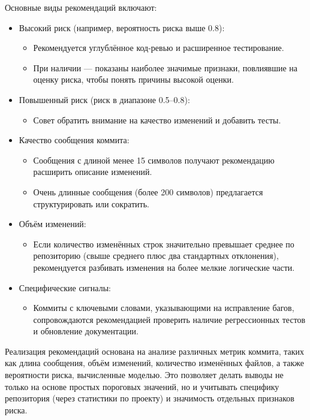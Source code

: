 \begin{itemize}
Основные виды рекомендаций включают:

\begin{itemize}
	\item Высокий риск (например, вероятность риска выше 0.8): 
	\begin{itemize}
		\item Рекомендуется углублённое код-ревью и расширенное тестирование.
		\item При наличии — показаны наиболее значимые признаки, повлиявшие на оценку риска, чтобы понять причины высокой оценки.
	\end{itemize}
	\item Повышенный риск (риск в диапазоне 0.5–0.8): 
	\begin{itemize}
		\item Совет обратить внимание на качество изменений и добавить тесты.
	\end{itemize}
	\item Качество сообщения коммита:
	\begin{itemize}
		\item Сообщения с длиной менее 15 символов получают рекомендацию расширить описание изменений.
		\item Очень длинные сообщения (более 200 символов) предлагается структурировать или сократить.
	\end{itemize}
	\item Объём изменений:
	\begin{itemize}
		\item Если количество изменённых строк значительно превышает среднее по репозиторию (свыше среднего плюс два стандартных отклонения), рекомендуется разбивать изменения на более мелкие логические части.
	\end{itemize}
	\item Специфические сигналы:
	\begin{itemize}
		\item Коммиты с ключевыми словами, указывающими на исправление багов, сопровождаются рекомендацией проверить наличие регрессионных тестов и обновление документации.
	\end{itemize}
\end{itemize}

Реализация рекомендаций основана на анализе различных метрик коммита, таких как длина сообщения, объём изменений, количество изменённых файлов, а также вероятности риска, вычисленные моделью. Это позволяет делать выводы не только на основе простых пороговых значений, но и учитывать специфику репозитория (через статистики по проекту) и значимость отдельных признаков риска.


\end{itemize}
